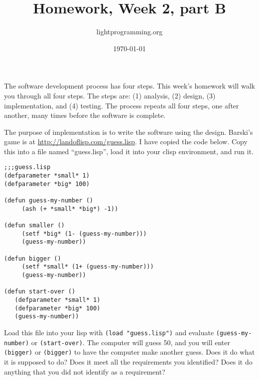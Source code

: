 \documentclass{article}
\title{Homework, Week 2, part B}
\author{lightprogramming.org}
\date{\today}
\begin{document}
\maketitle{}

The software development process has four steps. This week's homework will walk you through all four steps. The steps are: (1) analysis, (2) design, (3) implementation, and (4) testing. The process repeats all four steps, one after another, many times before the software is complete.

The purpose of implementation is to write the software using the design. Barski's game is at \url{http://landoflisp.com/guess.lisp}. I have copied the code below. Copy this into a file named ``guess.lisp'', load it into your clisp environment, and run it.

\lstset{language=Lisp,numbers=left,keepspaces=true,basicstyle=\small,numberstyle=\tiny}
\begin{lstlisting}
;;;guess.lisp
(defparameter *small* 1)
(defparameter *big* 100)

(defun guess-my-number ()
     (ash (+ *small* *big*) -1))

(defun smaller ()
     (setf *big* (1- (guess-my-number)))
     (guess-my-number))

(defun bigger ()
     (setf *small* (1+ (guess-my-number)))
     (guess-my-number))

(defun start-over ()
   (defparameter *small* 1)
   (defparameter *big* 100)
   (guess-my-number))
\end{lstlisting}

Load this file into your lisp with \texttt{(load "guess.lisp")} and evaluate \texttt{(guess-my-number)} or \texttt{(start-over)}. The computer will guess 50, and you will enter \texttt{(bigger)} or \texttt{(bigger)} to have the computer make another guess. Does it do what it is supposed to do? Does it meet all the requirements you identified? Does it do anything that you did not identify as a requirement?
\end{document}
